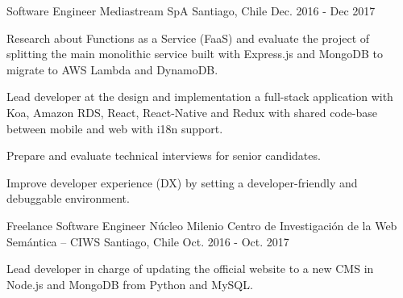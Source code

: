 \begin{cventries}
  \cventry
    {Software Engineer}
    {Mediastream SpA}
    {Santiago, Chile}
    {Dec. 2016 - Dec 2017}
    {
      \begin{cvitems}
        \item {Research about Functions as a Service (FaaS) and evaluate the project of splitting the main monolithic service built with Express.js and MongoDB to migrate to AWS Lambda and DynamoDB.}
        \item {Lead developer at the design and implementation a full-stack application with Koa, Amazon RDS, React, React-Native and Redux with shared code-base between mobile and web with i18n support.}
        \item {Prepare and evaluate technical interviews for senior candidates.}
        \item {Improve developer experience (DX) by setting a developer-friendly and debuggable environment.}
      \end{cvitems}
    }
    
  \cventry
    {Freelance Software Engineer}
    {Núcleo Milenio Centro de Investigación de la Web Semántica – CIWS}
    {Santiago, Chile}
    {Oct. 2016 - Oct. 2017}
    {
      \begin{cvitems}
        \item {Lead developer in charge of updating the official website to a new CMS in Node.js and MongoDB from Python and MySQL.}
      \end{cvitems}
    }

\end{cventries}
